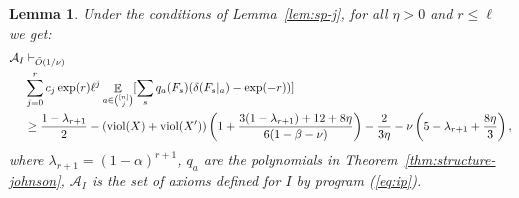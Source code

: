 \documentclass[11pt]{article}
\DeclareMathOperator*{\E}{\mathbb{E}}
\def \A {\mathcal{A}}
\def \viol {\mathrm{viol}}
\newtheorem{lemma}[theorem]{Lemma}
\theoremstyle{definition}
\begin{document}
\begin{lemma}\label{lem:structure-fs-j}
Under the conditions of Lemma~\ref{lem:sp-j}, for all $\eta > 0$ and $r \leq \ell$ we get:
\begin{align}
\A_I  
&\vdash_{\tilde{O}(1/\nu)} \\ 
&\sum_{j = 0}^r c_j \exp(r) \ell^j \E_{a \in {[n] \choose j}}[\sum_{s}q_{a}(F_s)(\delta(F_s|_a) - \exp(-r))] \notag\\
&\geq \frac{1 - \lambda_{r+1}}{2} 
- (\viol(X)+\viol(X'))\left(1+\frac{3(1-\lambda_{r+1})+ 12 +8\eta}{6(1-\beta-\nu)}\right) - \frac{2}{3\eta} - \nu\left(5 - \lambda_{r+1} + \frac{8\eta}{3}\right)\label{eq:sp-j-1},
\end{align}
where $\lambda_{r+1} = (1-\alpha)^{r+1}$, $q_a$ are the polynomials in Theorem~\ref{thm:structure-johnson}, $\A_I$ is the set of axioms defined for $I$ by program (\ref{eq:ip}).
\end{lemma}
\end{document}
